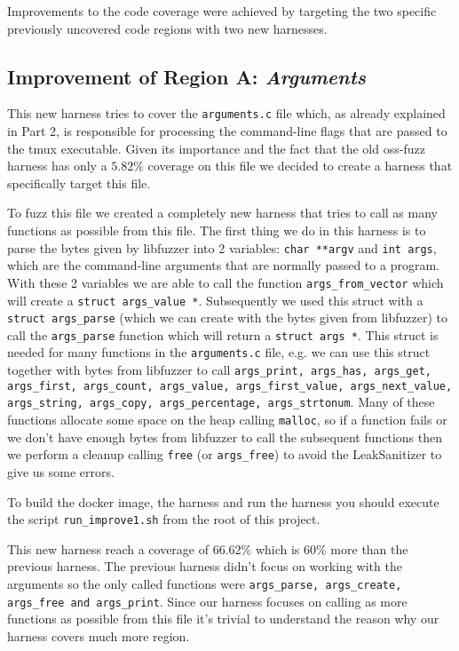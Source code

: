 \documentclass[11pt,a4paper,twocolumn]{article}
\begin{document}
Improvements to the code coverage were achieved by targeting the two specific previously uncovered code regions with two new harnesses.

\subsection*{Improvement of Region A: \textit{Arguments}} 

This new harness tries to cover the \texttt{arguments.c} file which, as already explained in Part 2, is responsible for processing the command-line flags that are passed to the tmux executable. Given its importance and the fact that the old oss-fuzz harness has only a $5.82\%$ coverage on this file we decided to create a harness that specifically target this file.

To fuzz this file we created a completely new harness that tries to call as many functions as possible from this file. The first thing we do in this harness is to parse the bytes given by libfuzzer into 2 variables: \texttt{char **argv} and \texttt{int args}, which are the command-line arguments that are normally passed to a program. With these 2 variables we are able to call the function \texttt{args\_from\_vector} which will create a \texttt{struct args\_value *}. Subsequently we used this struct with a \texttt{struct args\_parse} (which we can create with the bytes given from libfuzzer) to call the 
\texttt{args\_parse} function which will return a \texttt{struct args *}. This struct is needed for many functions in the \texttt{arguments.c} file, e.g. we can use this struct together with bytes from libfuzzer to call \texttt{args\_print, args\_has, args\_get, args\_first, args\_count, args\_value,  args\_first\_value, args\_next\_value,  args\_string, args\_copy, args\_percentage, args\_strtonum}. Many of these functions allocate some space on the heap calling \texttt{malloc}, so if a function fails or we don't have enough bytes from libfuzzer to call the subsequent functions then we perform a cleanup calling \texttt{free} (or \texttt{args\_free}) to avoid the LeakSanitizer to give us some errors. 

To build the docker image, the harness and run the harness you should execute the script \texttt{run\_improve1.sh} from the root of this project.

This new harness reach a coverage of 66.62\% which is 60\% more than the previous harness. The previous harness didn't focus on working with the arguments so the only called functions were \texttt{args\_parse, args\_create, args\_free and args\_print}. Since our harness focuses on calling as more functions as possible from this file it's trivial to understand the reason why our harness covers much more region.
\end{document}
